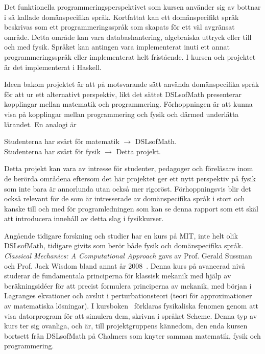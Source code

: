 \begin{draft}
Det funktionella programmeringsperspektivet som kursen använder sig av bottnar i
så kallade domänspecifika språk. Kortfattat kan ett domänspecifikt språk
beskrivas som ett programmeringsspråk som skapats för ett väl avgränsat
område. Detta område kan vara databashantering, algebraiska uttryck eller till
och med fysik. Språket kan antingen vara implementerat inuti ett annat
programmeringsspråk eller implementerat helt fristående. I kursen och projektet 
är det implementerat i Haskell.

Ideen bakom projektet är att på motsvarande sätt använda domänspecifika språk för att ur ett alternativt perspektiv, likt det sättet DSLsofMath
presenterar kopplingar mellan matematik och programmering. Förhoppningen är att kunna visa på kopplingar mellan programmering och fysik och därmed
underlätta lärandet. En analogi är


\begin{center}
Studenterna har svårt för matematik $\rightarrow $ DSLsofMath.\\ 
Studenterna har svårt för fysik $\rightarrow $ Detta projekt.
\end{center}

Detta projekt kan vara av intresse för studenter, pedagoger och
föreläsare inom de berörda områdena eftersom det här projektet ger ett nytt
perspektiv på fysik som inte bara är annorlunda utan också mer rigoröst.
Förhoppningsvis blir det också relevant för de som är intresserade av
domänspecifika språk i stort och kanske till och med för programledningen som
kan se denna rapport som ett skäl att introducera innehåll av detta slag i
fysikkurser.

Angående tidigare forskning och studier har en kurs på MIT, inte helt olik
DSLsofMath, tidigare givits som berör både fysik och 
domänspecifika språk.
\textit{Classical Mechanics: A Computational Approach} gavs av Prof. Gerald Sussman
och Prof. Jack Wisdom bland annat år 2008~\cite{classical-mechanics-course-mit-2008}.
Denna kurs på avancerad nivå studerar de fundamentala principerna för klassisk
mekanik med hjälp av beräkningsidéer för att precist formulera principerna av
mekanik, med början i Lagranges ekvationer och avslut i perturbationsteori
(teori för approximationer av matematiska lösningar). I kursboken~\cite{SICM}
förklaras fysikaliska fenomen genom att visa datorprogram för att simulera dem,
skrivna i språket Scheme. Denna typ av kurs ter sig ovanliga, och är, till
projektgruppens kännedom, den enda kursen bortsett från DSLsofMath på Chalmers som knyter
samman matematik, fysik och programmering.


\end{draft}
